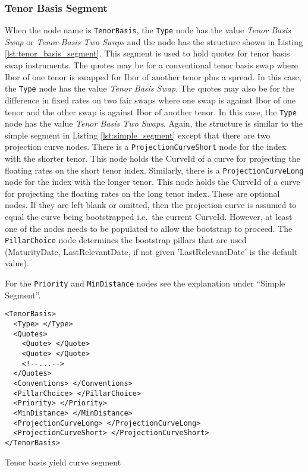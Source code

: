 \subsubsection*{Tenor Basis Segment}
When the node name is \lstinline!TenorBasis!, the \lstinline!Type! node has the value \emph{Tenor Basis Swap} or
\emph{Tenor Basis Two Swaps} and the node has the structure shown in Listing \ref{lst:tenor_basis_segment}. This segment
is used to hold quotes for tenor basis swap instruments. The quotes may be for a conventional tenor basis swap where
Ibor of one tenor is swapped for Ibor of another tenor plus a spread. In this case, the \lstinline!Type! node has the
value \emph{Tenor Basis Swap}. The quotes may also be for the difference in fixed rates on two fair swaps where one swap
is against Ibor of one tenor and the other swap is against Ibor of another tenor. In this case, the \lstinline!Type!
node has the value \emph{Tenor Basis Two Swaps}. Again, the structure is similar to the simple segment in Listing
\ref{lst:simple_segment} except that there are two projection curve nodes. There is a \lstinline!ProjectionCurveShort!
node for the index with the shorter tenor. This node holds the CurveId of a curve for projecting the floating rates on
the short tenor index. Similarly, there is a \lstinline!ProjectionCurveLong! node for the index with the longer
tenor. This node holds the CurveId of a curve for projecting the floating rates on the long tenor index. These are
optional nodes. If they are left blank or omitted, then the projection curve is assumed to equal the curve being
bootstrapped i.e.\ the current CurveId. However, at least one of the nodes needs to be populated to allow the bootstrap
to proceed. The \lstinline!PillarChoice! node determines the bootstrap pillars that are used (MaturityDate,
LastRelevantDate, if not given 'LastRelevantDate' is the default value).

For the \lstinline!Priority! and \lstinline!MinDistance! nodes see the explanation under ``Simple Segment''.

\begin{listing}[H]
\begin{verbatim}
<TenorBasis>
  <Type> </Type>
  <Quotes>
    <Quote> </Quote>
    <Quote> </Quote>
    <!--...-->
  </Quotes>
  <Conventions> </Conventions>
  <PillarChoice> </PillarChoice>
  <Priority> </Priority>
  <MinDistance> </MinDistance>
  <ProjectionCurveLong> </ProjectionCurveLong>
  <ProjectionCurveShort> </ProjectionCurveShort>
</TenorBasis>
\end{verbatim}
\caption{Tenor basis yield curve segment}
\label{lst:tenor_basis_segment}
\end{listing}

